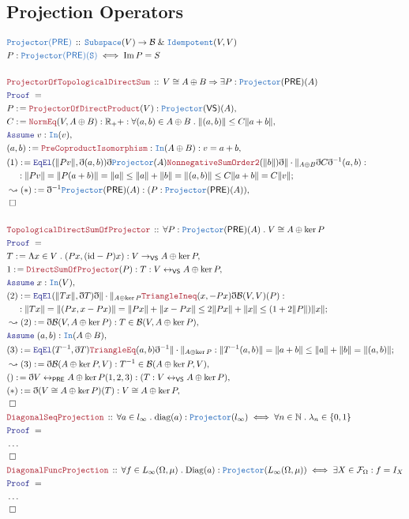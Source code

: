\documentclass[12pt]{scrartcl}
\newcommand{\TYPE}[1]{\textcolor{NavyBlue}{\mathtt{#1}}}
\newcommand{\LOGIC}[1]{\textcolor{Blue}{\mathtt{#1}}}
\newcommand{\THM}[1]{\textcolor{Maroon}{\mathtt{#1}}}
\renewcommand{\.}{\; . \;}
\newcommand{\de}{: \kern 0.1pc =}
\newcommand{\Theorem}[2]{& \THM{#1} \, :: \, #2 \\ & \Proof = \\ }
\newcommand{\DeclareType}[2]{& \TYPE{#1} \, :: \, #2 \\}
\newcommand{\DefineType}[3]{& #1 : \TYPE{#2} \iff #3 \\}
\newcommand{\NewLine}{\\ & \kern 1pc}
\newcommand{\Page}[1]{\begin{align*} #1 \end{align*} \newpage   }
\newcommand{ \bd }{ \ByDef }
\newcommand{\NoProof}{ & \ldots \\ \EndProof}
\renewcommand{\And}{\; \& \;}
\newcommand{\Reals}{\mathbb{R} }
\newcommand{\Nat}{\mathbb{N} }
\DeclareMathOperator*{\im}{Im}
\newcommand{\ToBij}{\leftrightarrow}
\newcommand{\Say}[3]{& #1 \de #2 : #3, \\}
\newcommand{\Conclude}[3]{& #1 \de #2 : #3; \\}
\newcommand{\Derive}[3]{& \leadsto #1 \de #2 : #3, \\}
\newcommand{\A}{\LOGIC{Assume} \;}
\newcommand{\Assume}[2]{& \A #1 : #2, \\}
\newcommand{\QED}{\; \square}
\newcommand{\EndProof}{& \QED \\}
\newcommand{\ByDef}{\eth}
\newcommand{\Proof}{\LOGIC{Proof} \; }
\newcommand{\PRE}{\mathsf{PRE}} %
\newcommand{\F}{\mathcal{F}}
\renewcommand{\O}{\Omega}
\newcommand{\B}{\mathcal{B}}
\begin{document}
 \subsection{Projection Operators}
 \Page{
    \DeclareType{Projector(\PRE)}{ \TYPE{Subspace}(V) \to \B \And \TYPE{Idempotent} (V,V) }
    \DefineType{P}{Projector(\PRE)(S)}{ \im P = S}
    \\
    \Theorem{ProjectorOfTopologicalDirectSum}{ V \cong A \oplus B \Rightarrow \exists P 
        : \TYPE{Projector}(\PRE)(A) }
    \Say{P}{\THM{ProjectorOfDirectProduct}(V)}{ \TYPE{Projector}(\mathsf{VS})(A)}
    \Say{C}{\THM{NormEq}(V, A \oplus B)}{ \Reals_++ : \forall (a,b) \in A \oplus B \. 
     \|  (a,b)   \| \le C\| a + b   \|    
    }    
    \Assume{v}{ \TYPE{In}(v) }
    \Say{(a,b)}{\THM{PreCoproductIsomorphism}}{ \TYPE{In}(A \oplus B) : v = a + b}
    \Conclude{(1)}{ 
    \LOGIC{EqEl}( \|Pv\|,\bd(a,b))\bd \TYPE{Projector}(A)
    \THM{NonnegativeSumOrder2}(  \| b \| )\bd \| \cdot \|_{A \oplus B} \bd C \bd^{-1}(a,b)
    }  
    { \NewLine : 
    \| Pv \| = \| P(a + b) \| = \| a \| \le \| a \| + \| b \|
       = \| (a,b) \| \le C \| a + b \| = C \| v \|    
     }
     \Derive{ (*)}{ \bd^{-1} \TYPE{Projector}(\PRE)(A)}{ (P : \TYPE{Projector}(\PRE)(A) )}
     \EndProof
     \\
      \Theorem{TopologicalDirectSumOfProjector}{ \forall P 
        : \TYPE{Projector}(\PRE)(A) \. V \cong A \oplus \ker P }
      \Say{T}{ \Lambda x \in V \. (Px, (\mathrm{id} - P)x) }{ V \to_{\mathsf{VS}} A \oplus \ker P}
      \Say{1}{ \THM{DirectSumOfProjector}(P) }{ T : V \ToBij_{\mathsf{VS}} A \oplus \ker P }
      \Assume{x}{\TYPE{In}(V)}
      \Conclude{(2)}{ \LOGIC{EqEl }( \| Tx \|  ,\bd T)\bd \| \cdot \|_{A \oplus \ker P}
         \THM{TriangleIneq}(x, -Px )\bd \B(V,V)(P)      
        }
      { \NewLine : \| Tx \| = \| (Px, x - Px) \| = \| Px \| + \| x - Px \| \le 2\| Px \| + \|x \| \le (1 + 2\|P\|)\| x \| }
     \Derive{(2)}{ \bd \B(V, A \oplus \ker P)}{ T \in \B(V, A \oplus \ker P)} 
     \Assume{(a,b)}{\TYPE{In}(A \oplus B)}
     \Conclude{(3)}{ \LOGIC{EqEl}(T^{-1}, \bd T)\THM{TriangleEq}(a,b)\bd^{-1} \| \cdot \|_{A \oplus \ker P} }
     { \| T^{-1}(a,b) \| = \| a + b \| \le \| a \| + \| b \| = \| (a,b) \| }
    \Derive{(3)}{ \bd \B( A \oplus \ker P,V)}{ T^{-1} \in \B( A \oplus \ker P, V)}
    \Say{()}{\bd V \ToBij_{\mathsf{PRE}} A \oplus \ker P (1,2,3)   }{ ( T : V \ToBij_{\mathsf{VS}} A \oplus \ker P )}  
    \Say{(*)}{ \bd(V \cong A \oplus \ker P )(T) }{ V \cong A \oplus \ker P }
    \EndProof
    \Theorem{DiagonalSeqProjection}{\forall  a \in l_\infty
    \. \mathrm{diag}(a) : \TYPE{Projector}(l_\infty) \iff \forall n \in \Nat \. \lambda_n \in \{ 0, 1 \} }
  \NoProof
  \Theorem{DiagonalFuncProjection}{\forall  f \in L_\infty(\O, \mu)
    \. \mathrm{Diag}(a) : \TYPE{Projector}(L_\infty(\O,\mu)) \iff 
    \exists X \in \F_\O : f = I_X }
    \NoProof
    }
\end{document}
